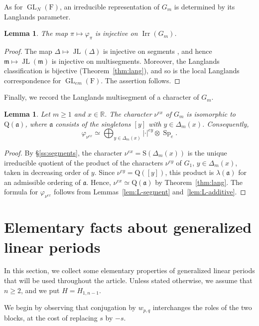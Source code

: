 \documentclass[11pt]{amsart}
\numberwithin{equation}{section}
\theoremstyle{plain}
\newtheorem{lemma}[theorem]{Lemma}
\theoremstyle{definition}
\theoremstyle{remark}
\newcommand{\R}{\mathbb{R}}
\DeclareMathOperator{\GL}{GL}
\DeclareMathOperator{\Irr}{Irr}
\DeclareMathOperator{\Sp}{Sp}
\DeclareMathOperator{\JL}{JL}
\newcommand{\mm}{\mathfrak{m}}
\newcommand{\aaa}{\mathfrak{a}}
\newcommand{\Ss}{\mathrm{S}}
\newcommand{\Qq}{\mathrm{Q}}
\begin{document}
As for $\GL_N(\mathrm{F})$, an irreducible representation of $G_m$ is determined by its Langlands parameter.

\begin{lemma}\label{lem:L-injective}
	The map $\pi\mapsto\varphi_{\pi}$ is injective on $\Irr(G_m)$.
\end{lemma}

\begin{proof}
	The map $\Delta\mapsto\JL(\Delta)$ is injective on segments \cite[\S2]{ALMSY24}, and hence $\mm\mapsto\JL(\mm)$ is injective on multisegments. Moreover, the Langlands classification is bijective (Theorem~\ref{thm:lang}), and so is the local Langlands correspondence for $\GL_{em}(\mathrm{F})$. The assertion follows.
\end{proof}

Finally, we record the Langlands multisegment of a character of $G_m$.

\begin{lemma}\label{lem:char-Langlands}
	Let $m\ge1$ and $x\in\R$. The character $\nu^{ex}$ of $G_m$ is isomorphic to $\Qq(\aaa)$, where $\aaa$ consists of the singletons $[y]$ with $y\in\Delta_m(x)$. Consequently,
	$$
	\varphi_{\nu^{ex}}\simeq\bigoplus_{y\in\Delta_m(x)}|\cdot|^{ey}\otimes\Sp_e.
	$$
\end{lemma}

\begin{proof}
	By \S\ref{ss:segments}, the character $\nu^{ex}=\Ss(\Delta_m(x))$ is the unique irreducible quotient of the product of the characters $\nu^{ey}$ of $G_1$, $y\in\Delta_m(x)$, taken in decreasing order of $y$. Since $\nu^{ey}=\Qq([y])$, this product is $\lambda(\aaa)$ for an admissible ordering of $\aaa$. Hence, $\nu^{ex}\simeq\Qq(\aaa)$ by Theorem~\ref{thm:lang}. The formula for $\varphi_{\nu^{ex}}$ follows from Lemmas~\ref{lem:L-segment} and~\ref{lem:L-additive}.
\end{proof}

\section{Elementary facts about generalized linear periods}\label{sec:elementary}

In this section, we collect some elementary properties of generalized linear periods that will be used throughout the article. Unless stated otherwise, we assume that $n\ge2$, and we put $H=H_{1,n-1}$.

We begin by observing that conjugation by $w_{p,q}$ interchanges the roles of the two blocks, at the cost of replacing $s$ by $-s$.
\end{document}
